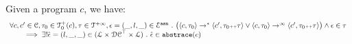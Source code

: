 \begin{lem}
  Given a program ${c}$, we have:
  \[
    \begin{array}{l}
      \forall c, c'\in \mathcal{C}, \mathtt{\tau}_0 \in \mathcal{T}^{+}_0(c), \mathtt{\tau} \in \mathcal{T}^{+\infty} ,  \mathtt{\epsilon} = (\_, l, \_) \in \mathcal{E}^{\mathtt{{asn}}} ~.~
      \big(\langle {c}, \mathtt{\tau}_0 \rangle \to^{*} \langle c', \mathtt{\tau}_0 {\scriptscriptstyle ++} \mathtt{\tau} \rangle 
      \lor 
      \langle {c}, \mathtt{\tau}_0 \rangle \to^{\infty} \langle c', \mathtt{\tau}_0 {\scriptscriptstyle ++} \mathtt{\tau} \rangle 
      \big)
      \land \mathtt{\epsilon} \in \mathtt{\tau} 
      \\
      \qquad \implies \exists! \hat{\mathtt{\epsilon}{}} = (l, \_, \_) \in (\mathcal{L}\times \mathcal{DC}^{\top} \times \mathcal{L}) ~.~ 
      \hat{\mathtt{\epsilon}{}} \in \mathtt{abs}{\mathtt{trace}}(c)
    \end{array}
  \]
  \end{lem}
